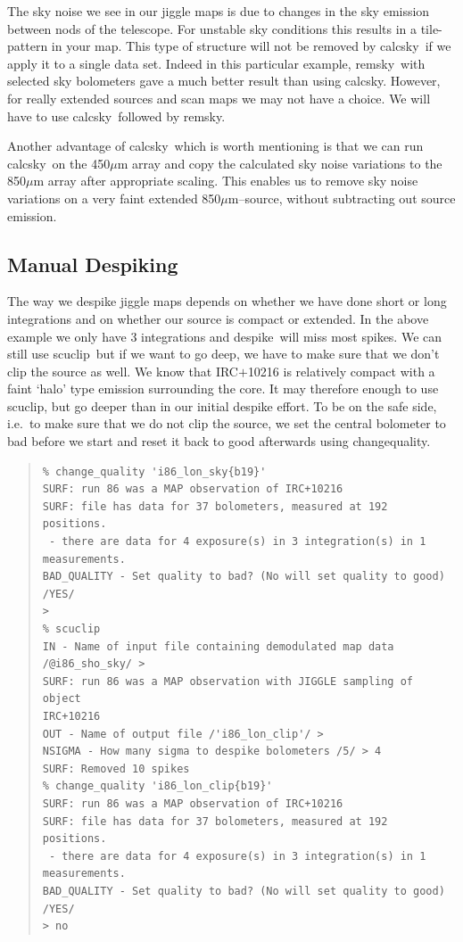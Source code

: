 \documentclass[twoside,11pt]{article}
\newenvironment{myquote}{\begin{quote}\begin{small}}{\end{small}\end{quote}}
\newcommand{\task}[1]{\textsf{#1}}
\newcommand{\calcsky}{\xref{\task{calcsky}}{sun216}{CALCSKY}}
\newcommand{\chgqual}{\xref{\task{change\_\-qua\-lity}}{sun216}{CHANGE_QUALITY}}
\newcommand{\desp}{\xref{\task{despike}}{sun216}{DESPIKE}}
\newcommand{\remsky}{\xref{\task{remsky}}{sun216}{REMSKY}}
\newcommand{\scuclip}{\xref{\task{scuclip}}{sun216}{SCUCLIP}}
\newcommand{\xref}[3]{#1}
\newcommand{\xlabel}[1]{}
\renewcommand{\_}{\texttt{\symbol{95}}}
\begin{document}
The sky noise we see in our jiggle maps is due to changes in the sky
emission between nods of the telescope.  For unstable sky conditions
this results in a tile-pattern in your map.  This type of structure
will not be removed by \calcsky\ if we apply it to a single data set. 
Indeed in this particular example, \remsky\ with selected sky
bolometers gave a much better result than using \calcsky.  However,
for really extended sources and scan maps we may not have a choice. 
We will have to use \calcsky\ followed by \remsky.

Another advantage of \calcsky\ which is worth mentioning is that we
can run \calcsky\ on the 450$\mu$m array and copy the calculated sky
noise variations to the 850$\mu$m array after appropriate scaling. 
This enables us to remove sky noise variations on a very faint
extended 850$\mu$m--source, without subtracting out source emission. 

\subsection{\xlabel{Despiking} Manual Despiking}

The way we despike jiggle maps depends on whether we have done short
or long integrations and on whether our source is compact or extended. 
In the above example we only have 3 integrations and \desp\ will miss
most spikes.  We can still use \scuclip\, but if we want to go deep,
we have to make sure that we don't clip the source as well.  We know
that IRC$+$10216 is relatively compact with a faint `halo' type
emission surrounding the core.  It may therefore enough to use
\scuclip, but go deeper than in our initial despike effort.  To be on
the safe side, i.e.\ to make sure that we do not clip the source, we
set the central bolometer to bad before we start and reset it back to
good afterwards using \chgqual.


\begin{myquote}
\begin{verbatim}
% change_quality 'i86_lon_sky{b19}'
SURF: run 86 was a MAP observation of IRC+10216
SURF: file has data for 37 bolometers, measured at 192 positions.
 - there are data for 4 exposure(s) in 3 integration(s) in 1 
measurements.
BAD_QUALITY - Set quality to bad? (No will set quality to good) /YES/ 
> 
% scuclip
IN - Name of input file containing demodulated map data 
/@i86_sho_sky/ > 
SURF: run 86 was a MAP observation with JIGGLE sampling of object 
IRC+10216
OUT - Name of output file /'i86_lon_clip'/ > 
NSIGMA - How many sigma to despike bolometers /5/ > 4
SURF: Removed 10 spikes
% change_quality 'i86_lon_clip{b19}'
SURF: run 86 was a MAP observation of IRC+10216
SURF: file has data for 37 bolometers, measured at 192 positions.
 - there are data for 4 exposure(s) in 3 integration(s) in 1 
measurements.
BAD_QUALITY - Set quality to bad? (No will set quality to good) /YES/ 
> no
\end{verbatim}
\end{myquote}
\end{document}
